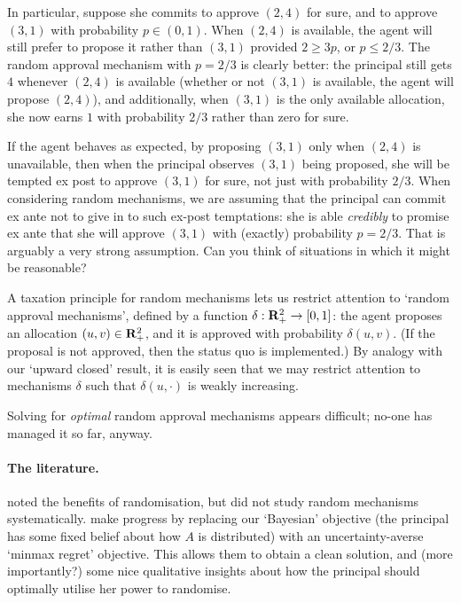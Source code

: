 In particular, suppose she commits to approve $(2,4)$ for sure,
and to approve $(3,1)$ with probability $p \in (0,1)$.
When $(2,4)$ is available, the agent will still prefer to propose it rather than $(3,1)$ provided $2 \geq 3p$, or $p \leq 2/3$.
The random approval mechanism with $p=2/3$ is clearly better:
the principal still gets $4$ whenever $(2,4)$ is available (whether or not $(3,1)$ is available, the agent will propose $(2,4)$),
and additionally, when $(3,1)$ is the only available allocation,
she now earns $1$ with probability $2/3$ rather than zero for sure.

\begin{remark}
	\label{remark:randomisation_commitment}
	If the agent behaves as expected, by proposing $(3,1)$ only when $(2,4)$ is unavailable, then when the principal observes $(3,1)$ being proposed, she will be tempted ex post to approve $(3,1)$ for sure, not just with probability $2/3$.
	When considering random mechanisms,
	we are assuming that the principal can commit ex ante not to give in to such ex-post temptations:
	she is able \emph{credibly} to promise ex ante that she will approve $(3,1)$ with (exactly) probability $p=2/3$.
	That is arguably a very strong assumption. Can you think of situations in which it might be reasonable?
\end{remark}

A taxation principle for random mechanisms lets us restrict attention to `random approval mechanisms', defined by a function $\delta : \mathbf{R}_+^2 \to [0,1]$: the agent proposes an allocation $(u,v) \in \mathbf{R}_+^2$, and it is approved with probability $\delta(u,v)$. (If the proposal is not approved, then the status quo is implemented.)
By analogy with our `upward closed' result, it is easily seen that we may restrict attention to mechanisms $\delta$ such that $\delta(u,\cdot)$ is weakly increasing.

Solving for \emph{optimal} random approval mechanisms appears difficult; no-one has managed it so far, anyway.


\paragraph{The literature.}
\textcite{ArmstrongVickers2010} noted the benefits of randomisation, but did not study random mechanisms systematically.
\textcite{GuoShmaya2022} make progress by replacing our `Bayesian' objective (the principal has some fixed belief about how $A$ is distributed)
with an uncertainty-averse `minmax regret' objective.
This allows them to obtain a clean solution,
and (more importantly?) some nice qualitative insights about how the principal should optimally utilise her power to randomise.



